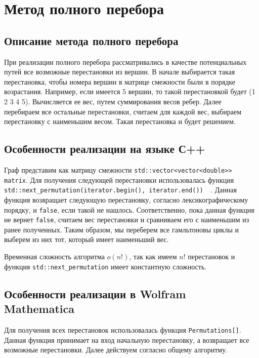 \documentclass[12pt, a4paper]{article}
\begin{document}

\section{Метод полного перебора} 
\subsection{Описание метода полного перебора}
При реализации полного перебора рассматривались в качестве потенциальных путей все возможные перестановки из вершин.
В начале выбирается такая перестановка, чтобы номера вершин в матрице смежности были в порядке возрастания. Например, если имеется 5 вершин, то такой перестановкой будет (1 2 3 4 5). Вычисляется ее вес, путем суммирования весов ребер. Далее перебираем все остальные перестановки, считаем для каждой вес, выбираем перестановку с наименьшим весом. Такая перестановка и будет решением.

\subsection{Особенности реализации на языке С++}
Граф представим как матрицу смежности \texttt{std::vector<vector<double{>}{>} matrix}.
Для получения следующей перестановки использовалась функция \linebreak \texttt{std::next\_permutation(iterator.begin(), iterator.end()) }~\cite{nextperm}. Данная функция возвращает следующую перестановку, согласно лексикографическому порядку, и \texttt{false}, если такой не нашлось. Соответственно, пока данная функция не вернет \texttt{false}, считаем вес перестановки и сравниваем его с наименьшим из ранее полученных. Таким образом, мы переберем все гамльтоновы циклы и выберем из них тот, который имеет наименьший вес. 

Временная сложность алгоритма $o(n!)$, так как имеем $n!$ перестановок и функция \texttt{std::next\_permutation} имеет константную сложность.
\subsection{Особенности реализации в Wolfram Mathematica}
Для получения всех перестановок использовалась функция \texttt{Permutations[]}. Данная функция принимает на вход начальную перестановку, а возвращает все возможные перестановки. Далее действуем согласно общему алгоритму.
\end{document}
